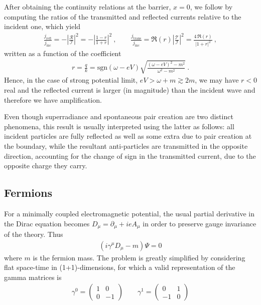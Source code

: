 After obtaining the continuity relations at the barrier, $x=0$, we follow by computing the ratios of the transmitted and reflected currents relative to the incident one, which yield
\begin{align}
    \frac{j_\mathrm{refl}}{j_\mathrm{inc}} = - \left|\frac{\mathcal{R}}{\mathcal{I}}\right|^2 = -\left|\frac{1-r}{1+r}\right|^2  ~, \qquad \frac{j_\mathrm{trans}}{j_\mathrm{inc}} = \Re(r) \left|\frac{\mathcal{T}}{\mathcal{I}}\right|^2 = \frac{4\, \Re(r)}{|1+r|^2} ~,
\end{align}
written as a function of the coefficient 
\begin{align}
    r = \frac{q}{k} = \mathrm{sgn}(\omega - e V)  \sqrt{\frac{(\omega - e V)^2 - m^2}{\omega^2 - m^2}} ~.
\end{align}
Hence, in the case of strong potential limit, $e V > \omega + m \gtrsim 2 m$, we may have $r<0$ real and the reflected current is larger (in magnitude) than the incident wave and therefore we have amplification.

Even though superradiance and spontaneous pair creation are two distinct phenomena, this result is usually interpreted using the latter as follows: all incident particles are fully reflected as well as some extra due to pair creation at the boundary, while the resultant anti-particles are transmitted in the opposite direction, accounting for the change of sign in the transmitted current, due to the opposite charge they carry.

\subsection{Fermions}

For a minimally coupled electromagnetic potential, the usual partial derivative in the Dirac equation becomes $D_\mu = \partial_\mu + i e A_\mu$ in order to preserve gauge invariance of the theory. Thus
\begin{align}
    ( i \gamma^\mu D_\mu - m ) \Psi = 0
    \label{eq:dirac}
\end{align}
where $m$ is the fermion mass.
The problem is greatly simplified by considering flat space-time in (1+1)-dimensions, for which a valid representation of the gamma matrices is
\begin{align}
    \gamma^0 = \left(\begin{array}{cr} 1 & 0 \\  0 & -1 \end{array}\right) \qquad 
    \gamma^1 = \left(\begin{array}{cr} 0 & 1 \\ -1 & 0 \end{array}\right)
    \label{eq:gamma1+1}
\end{align}

